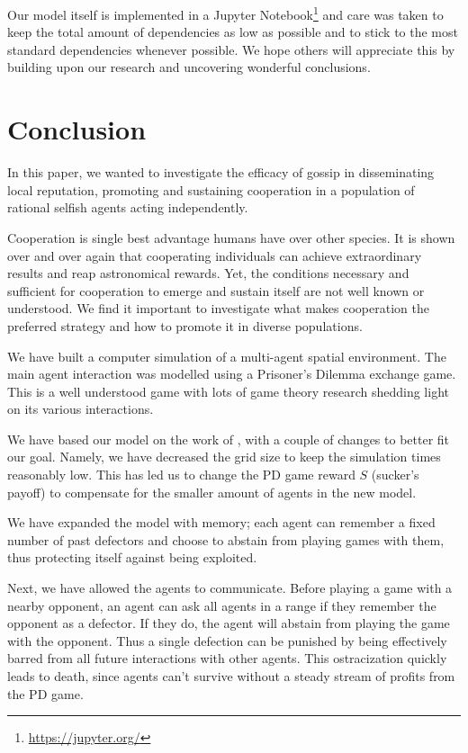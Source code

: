 \documentclass[english]{article}
\begin{document}
Our model itself is implemented in a Jupyter Notebook\footnote{\url{https://jupyter.org/}} and care was taken to keep the total amount of dependencies as low as possible and to stick to the most standard dependencies whenever possible.
We hope others will appreciate this by building upon our research and uncovering wonderful conclusions.



\section{Conclusion}
In this paper, we wanted to investigate the efficacy of gossip in disseminating local reputation, promoting and sustaining cooperation in a population of rational selfish agents acting independently.

Cooperation is single best advantage humans have over other species.
It is shown over and over again that cooperating individuals can achieve extraordinary results and reap astronomical rewards.
Yet, the conditions necessary and sufficient for cooperation to emerge and sustain itself are not well known or understood.
We find it important to investigate what makes cooperation the preferred strategy and how to promote it in diverse populations.

We have built a computer simulation of a multi-agent spatial environment.
The main agent interaction was modelled using a Prisoner's Dilemma exchange game. This is a well understood game with lots of game theory research shedding light on its various interactions.

We have based our model on the work of \citet{smaldino}, with a couple of changes to better fit our goal.
Namely, we have decreased the grid size to keep the simulation times reasonably low.
This has led us to change the PD game reward $S$ (sucker's payoff) to compensate for the smaller amount of agents in the new model.

We have expanded the model with memory; each agent can remember a fixed number of past defectors and choose to abstain from playing games with them, thus protecting itself against being exploited.

Next, we have allowed the agents to communicate. Before playing a game with a nearby opponent, an agent can ask all agents in a range if they remember the opponent as a defector. If they do, the agent will abstain from playing the game with the opponent.
Thus a single defection can be punished by being effectively barred from all future interactions with other agents.
This ostracization quickly leads to death, since agents can't survive without a steady stream of profits from the PD game.
\end{document}
